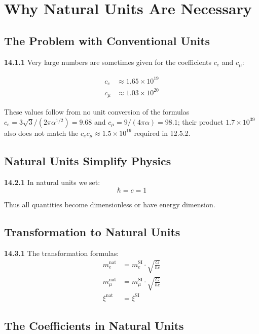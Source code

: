 \section{Why Natural Units Are Necessary}

\subsection{The Problem with Conventional Units}

\noindent \textbf{14.1.1} Very large numbers are sometimes given for the coefficients $c_e$ and $c_\mu$:

\begin{align*}
	c_e &\approx 1.65 \times 10^{19} \\
	c_\mu &\approx 1.03 \times 10^{20}
\end{align*}

These values follow from no unit conversion of the formulas $c_e = 3\sqrt3/(2\pi\alpha^{1/2}) = 9.68$ and $c_\mu = 9/(4\pi\alpha) = 98.1$; their product $1.7\times10^{39}$ also does not match the $c_e c_\mu \approx 1.5\times10^{19}$ required in 12.5.2.

\subsection{Natural Units Simplify Physics}

\noindent \textbf{14.2.1} In natural units we set:
\[
\hbar = c = 1
\]

Thus all quantities become dimensionless or have energy dimension.

\subsection{Transformation to Natural Units}

\noindent \textbf{14.3.1} The transformation formulas:
\begin{align*}
	m_e^{\text{nat}} &= m_e^{\text{SI}} \cdot \sqrt{\frac{G}{\hbar c}} \\
	m_\mu^{\text{nat}} &= m_\mu^{\text{SI}} \cdot \sqrt{\frac{G}{\hbar c}} \\
	\xi^{\text{nat}} &= \xi^{\text{SI}}
\end{align*}

\subsection{The Coefficients in Natural Units}

